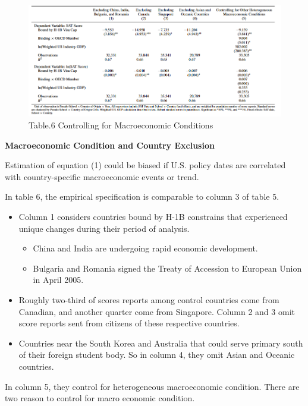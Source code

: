 \documentclass[../root]{subfiles}
\begin{document}
    \begin{figure}
        \centering
        \includegraphics[width = \linewidth]{1016sugiyama/Table_6.png}
        \caption{Table.6 Controlling for Macroeconomic Conditions}
        \label{fig:my_label}
    \end{figure}
    
    
   {\bf Macroeconomic Condition and Country Exclusion}
   
   Estimation of equation (1) could be biased if U.S. policy dates are correlated with country-specific macroeconomic events or trend.
   
   In table 6, the empirical specification is comparable to column 3 of table 5.
   
   \begin{itemize}
       \item Column 1 considers countries bound by H-1B constrains that experienced unique changes during their period of analysis.
       \begin{itemize}
           \item China and India are undergoing rapid economic development.
           \item Bulgaria and Romania signed the Treaty of Accession to European Union in April 2005.
           
       \end{itemize}
       \item Roughly two-third of scores reports among control countries come from Canadian, and another quarter come from Singapore. Column 2 and 3 omit score reports sent from citizens of these respective countries.
       \item Countries near the South Korea and Australia that could serve primary south of their foreign student body. So in column 4, they omit Asian and Oceanic countries.
   \end{itemize}
   
   In column 5, they control for heterogeneous macroeconomic condition. There are two reason to control for macro economic condition.
   
\end{document}
